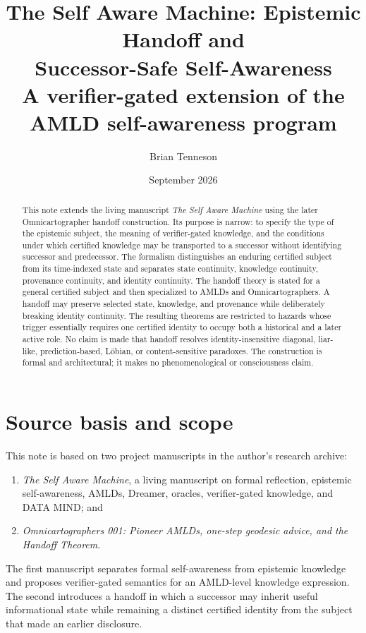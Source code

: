 \documentclass[11pt]{article}
\title{\textbf{The Self Aware Machine: Epistemic Handoff and\\Successor-Safe Self-Awareness}\\[0.7em]
\large A verifier-gated extension of the AMLD self-awareness program}
\author{Brian Tenneson}
\date{September 2026}
\theoremstyle{remark}
\begin{document}
\maketitle

\begin{abstract}
This note extends the living manuscript \emph{The Self Aware Machine} using the later Omnicartographer handoff construction. Its purpose is narrow: to specify the type of the epistemic subject, the meaning of verifier-gated knowledge, and the conditions under which certified knowledge may be transported to a successor without identifying successor and predecessor. The formalism distinguishes an enduring certified subject from its time-indexed state and separates state continuity, knowledge continuity, provenance continuity, and identity continuity. The handoff theory is stated for a general certified subject and then specialized to AMLDs and Omnicartographers. A handoff may preserve selected state, knowledge, and provenance while deliberately breaking identity continuity. The resulting theorems are restricted to hazards whose trigger essentially requires one certified identity to occupy both a historical and a later active role. No claim is made that handoff resolves identity-insensitive diagonal, liar-like, prediction-based, L\"obian, or content-sensitive paradoxes. The construction is formal and architectural; it makes no phenomenological or consciousness claim.
\end{abstract}

\tableofcontents
\newpage

\section{Source basis and scope}

This note is based on two project manuscripts in the author's research archive:
\begin{enumerate}[label=(\roman*)]
\item \emph{The Self Aware Machine}, a living manuscript on formal reflection, epistemic self-awareness, AMLDs, Dreamer, oracles, verifier-gated knowledge, and DATA MIND; and
\item \emph{Omnicartographers 001: Pioneer AMLDs, one-step geodesic advice, and the Handoff Theorem}.
\end{enumerate}
The first manuscript separates formal self-awareness from epistemic knowledge and proposes verifier-gated semantics for an AMLD-level knowledge expression. The second introduces a handoff in which a successor may inherit useful informational state while remaining a distinct certified identity from the subject that made an earlier disclosure.
\end{document}
